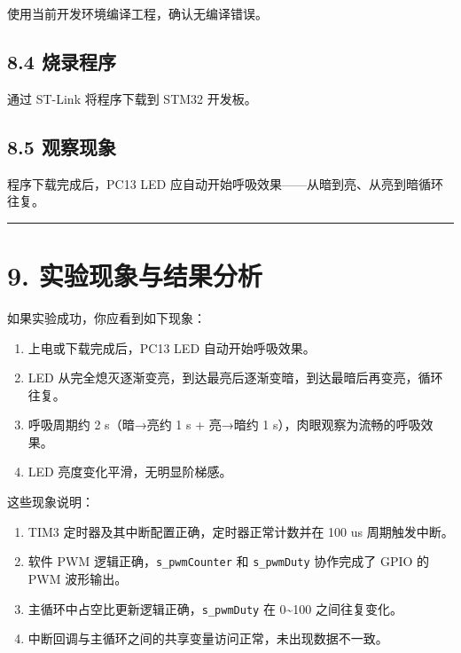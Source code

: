 \documentclass[
  chinese,
  UTF8,
  oneside,
  openany]{ctexbook}
\providecommand{\tightlist}{%
  \setlength{\itemsep}{0pt}\setlength{\parskip}{0pt}}
\begin{document}
使用当前开发环境编译工程，确认无编译错误。

\subsection{8.4 烧录程序}\label{ux70e7ux5f55ux7a0bux5e8f-3}

通过 ST-Link 将程序下载到 STM32 开发板。

\subsection{8.5 观察现象}\label{ux89c2ux5bdfux73b0ux8c61}

程序下载完成后，PC13 LED
应自动开始呼吸效果------从暗到亮、从亮到暗循环往复。

\begin{center}\rule{0.5\linewidth}{0.5pt}\end{center}

\section{9.
实验现象与结果分析}\label{ux5b9eux9a8cux73b0ux8c61ux4e0eux7ed3ux679cux5206ux6790-3}

如果实验成功，你应看到如下现象：

\begin{enumerate}
\def\labelenumi{\arabic{enumi}.}
\tightlist
\item
  上电或下载完成后，PC13 LED 自动开始呼吸效果。
\item
  LED
  从完全熄灭逐渐变亮，到达最亮后逐渐变暗，到达最暗后再变亮，循环往复。
\item
  呼吸周期约 2 s（暗→亮约 1 s + 亮→暗约 1
  s），肉眼观察为流畅的呼吸效果。
\item
  LED 亮度变化平滑，无明显阶梯感。
\end{enumerate}

这些现象说明：

\begin{enumerate}
\def\labelenumi{\arabic{enumi}.}
\tightlist
\item
  TIM3 定时器及其中断配置正确，定时器正常计数并在 100 us 周期触发中断。
\item
  软件 PWM 逻辑正确，\texttt{s\_pwmCounter} 和 \texttt{s\_pwmDuty}
  协作完成了 GPIO 的 PWM 波形输出。
\item
  主循环中占空比更新逻辑正确，\texttt{s\_pwmDuty} 在 0\textasciitilde100
  之间往复变化。
\item
  中断回调与主循环之间的共享变量访问正常，未出现数据不一致。
\end{enumerate}
\end{document}
